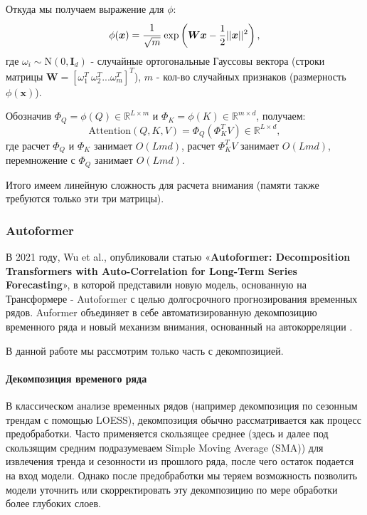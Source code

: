 Откуда мы получаем выражение для $\phi$:
\begin{equation*}
    \phi(\bm{x}) = \cfrac{1}{\sqrt{m}} \ \text{exp} \left( \bm{W} \bm{x} - \frac{1}{2} || \bm{x} ||^2 \right),
\end{equation*}
где $\omega_i \sim \mathrm{N}(0, \bm{I}_d)$ - случайные ортогональные Гауссовы вектора 
(строки матрицы $\bm{W} = [\omega_1^T \ \omega_2^T ... \omega_m^T]^T$), 
$m$ - кол-во случайных признаков (размерность $\phi(\bm{x})$).

Обозначив $\Phi_Q = \phi(Q) \in \mathbb{R}^{L \times m}$ и $\Phi_K = \phi(K) \in \mathbb{R}^{m \times d}$, 
получаем:
\begin{equation*}
    \text{Attention}(Q,K,V) = \Phi_Q (\Phi_K^T V) \in \mathbb{R}^{L \times d},
\end{equation*}
где расчет $\Phi_Q$ и $\Phi_K$ занимает $O(L m d)$, 
расчет $\Phi_K^T V$ занимает $O(L m d)$, 
перемножение с $\Phi_Q$ занимает $O(L m d)$. 

Итого имеем линейную сложность для расчета внимания (памяти также требуются только 
эти три матрицы).

\subsubsection{Autoformer}

В 2021 году, Wu et al., опубликовали статью 
«\textbf{Autoformer: Decomposition Transformers with
Auto-Correlation for Long-Term Series Forecasting}», 
в которой представили новую модель, основанную на Трансформере - 
Autoformer с целью долгосрочного прогнозирования временных рядов. 
Auformer объединяет в себе автоматизированную 
декомпозицию временного ряда и новый механизм внимания, 
основанный на автокорреляции \cite{autoformer}.

В данной работе мы рассмотрим только часть с декомпозицией. 

\paragraph{Декомпозиция временого ряда}

В классическом анализе временных рядов (например 
декомпозиция по сезонным трендам с помощью LOESS), 
декомпозиция обычно рассматривается как процесс 
предобработки. Часто применяется скользящее среднее 
(здесь и далее под скользящим средним подразумеваем 
Simple Moving Average (SMA)) для извлечения тренда 
и сезонности из прошлого ряда, после чего остаток 
подается на вход модели. Однако после предобработки 
мы теряем возможность позволить модели 
уточнить или скорректировать эту декомпозицию 
по мере обработки более глубоких слоев.

